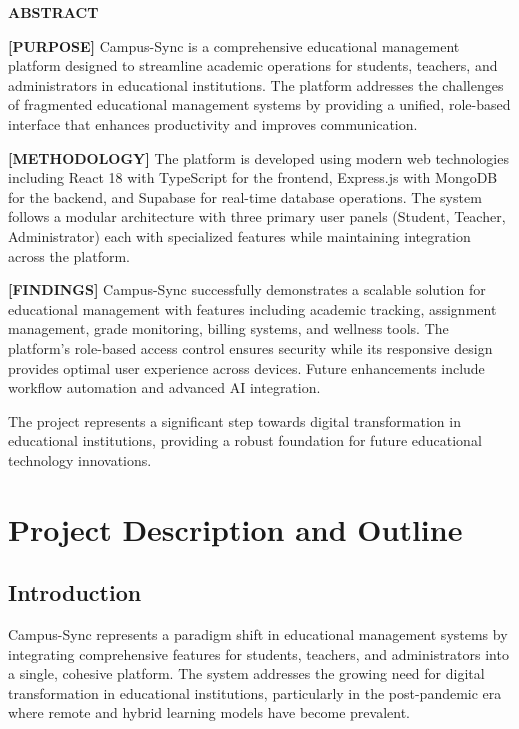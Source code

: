 \newpage
\thispagestyle{empty}
\centering

{\Huge\bfseries\textcolor{titleblue}{ABSTRACT}}\par

\vspace{1cm}
\begin{minipage}{0.9\textwidth}
\setlength{\parindent}{0pt}
\setlength{\parskip}{1em}

\textbf{[PURPOSE]} Campus-Sync is a comprehensive educational management platform designed to streamline academic operations for students, teachers, and administrators in educational institutions. The platform addresses the challenges of fragmented educational management systems by providing a unified, role-based interface that enhances productivity and improves communication.

\textbf{[METHODOLOGY]} The platform is developed using modern web technologies including React 18 with TypeScript for the frontend, Express.js with MongoDB for the backend, and Supabase for real-time database operations. The system follows a modular architecture with three primary user panels (Student, Teacher, Administrator) each with specialized features while maintaining integration across the platform.

\textbf{[FINDINGS]} Campus-Sync successfully demonstrates a scalable solution for educational management with features including academic tracking, assignment management, grade monitoring, billing systems, and wellness tools. The platform's role-based access control ensures security while its responsive design provides optimal user experience across devices. Future enhancements include workflow automation and advanced AI integration.

The project represents a significant step towards digital transformation in educational institutions, providing a robust foundation for future educational technology innovations.
\end{minipage}

\newpage
\tableofcontents
\thispagestyle{empty}

\newpage
\section{Project Description and Outline}

\subsection{Introduction}
Campus-Sync represents a paradigm shift in educational management systems by integrating comprehensive features for students, teachers, and administrators into a single, cohesive platform. The system addresses the growing need for digital transformation in educational institutions, particularly in the post-pandemic era where remote and hybrid learning models have become prevalent.

